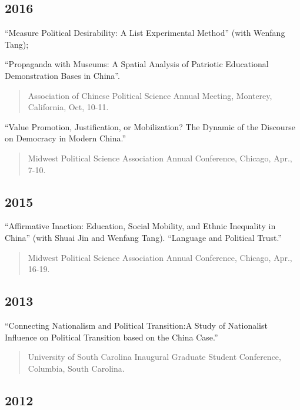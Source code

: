 \documentclass[10.5pt,]{article}
\begin{document}
\subsection{2016}\label{section-1}

``Measure Political Desirability: A List Experimental Method'' (with
Wenfang Tang);

``Propaganda with Museums: A Spatial Analysis of Patriotic Educational
Demonstration Bases in China''.

\begin{quote}
\footnotesize Association of Chinese Political Science Annual Meeting,
Monterey, California, Oct, 10-11.
\end{quote}

``Value Promotion, Justification, or Mobilization? The Dynamic of the
Discourse on Democracy in Modern China.''

\begin{quote}
\footnotesize Midwest Political Science Association Annual Conference,
Chicago, Apr., 7-10.
\end{quote}

\subsection{2015}\label{section-2}

``Affirmative Inaction: Education, Social Mobility, and Ethnic
Inequality in China'' (with Shuai Jin and Wenfang Tang). ``Language and
Political Trust.''

\begin{quote}
\footnotesize Midwest Political Science Association Annual Conference,
Chicago, Apr., 16-19.
\end{quote}

\subsection{2013}\label{section-3}

``Connecting Nationalism and Political Transition:A Study of Nationalist
Influence on Political Transition based on the China Case.''

\begin{quote}
\footnotesize University of South Carolina Inaugural Graduate Student
Conference, Columbia, South Carolina.
\end{quote}

\subsection{2012}\label{section-4}
\end{document}
